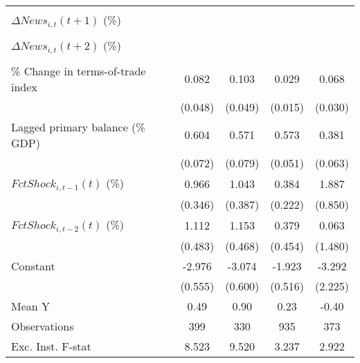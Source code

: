{\begin{tabular}{l*{4}{c}}
                    &                     &                     &                     &                     \\
\addlinespace
$ \Delta News_{i,t}(t+1)$ (\%)&                     &                     &                     &                     \\
                    &                     &                     &                     &                     \\
\addlinespace
$ \Delta News_{i,t}(t+2)$ (\%)&                     &                     &                     &                     \\
                    &                     &                     &                     &                     \\
\addlinespace
\% Change in terms-of-trade index&       0.082         &       0.103\sym{*}  &       0.029\sym{*}  &       0.068\sym{**} \\
                    &     (0.048)         &     (0.049)         &     (0.015)         &     (0.030)         \\
\addlinespace
Lagged primary balance (\% GDP)&       0.604\sym{***}&       0.571\sym{***}&       0.573\sym{***}&       0.381\sym{***}\\
                    &     (0.072)         &     (0.079)         &     (0.051)         &     (0.063)         \\
\addlinespace
$ FctShock_{i,t-1}(t)$ (\%)&       0.966\sym{**} &       1.043\sym{**} &       0.384\sym{*}  &       1.887\sym{**} \\
                    &     (0.346)         &     (0.387)         &     (0.222)         &     (0.850)         \\
\addlinespace
$ FctShock_{i,t-2}(t)$ (\%)&       1.112\sym{**} &       1.153\sym{**} &       0.379         &       0.063         \\
                    &     (0.483)         &     (0.468)         &     (0.454)         &     (1.480)         \\
\addlinespace
Constant            &      -2.976\sym{***}&      -3.074\sym{***}&      -1.923\sym{***}&      -3.292         \\
                    &     (0.555)         &     (0.600)         &     (0.516)         &     (2.225)         \\
\midrule
Mean Y              &        0.49         &        0.90         &        0.23         &       -0.40         \\
Observations        &         399         &         330         &         935         &         373         \\
Exc. Inst. F-stat   &       8.523         &       9.520         &       3.237         &       2.922         \\
\bottomrule
\end{tabular}
}
